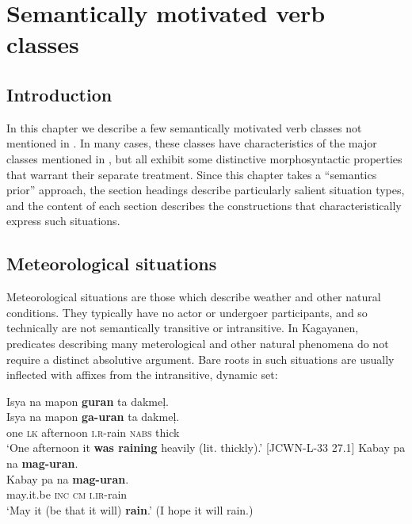 \chapter{Semantically motivated verb classes}
\label{chap:verbclasses-2}
\section{Introduction}
\label{sec:introduction-9}

In this chapter we describe a few semantically motivated verb classes not mentioned in . In many cases, these classes have characteristics of the major classes mentioned in , but all exhibit some distinctive morphosyntactic properties that warrant their separate treatment. Since this chapter takes a “semantics prior” approach, the section headings describe particularly salient situation types, and the content of each section describes the constructions that characteristically express such situations.

\section{Meteorological situations}
\label{sec:meteorologicalsituations}

Meteorological situations are those which describe weather and other natural conditions. They typically have no actor or undergoer participants, and so technically are not semantically transitive or intransitive. In Kagayanen, predicates describing many meterological and other natural phenomena do not require a distinct absolutive argument. Bare roots in such situations are usually inflected with affixes from the intransitive, dynamic set:

\ea
Isya  na  mapon  \textbf{guran}   ta  dakmeļ. \\\smallskip
\gll Isya  na  mapon  \textbf{ga-uran}   ta  dakmeļ. \\
one  \textsc{lk} afternoon  \textsc{i.r}-rain  \textsc{nabs}  thick \\
\glt ‘One afternoon it \textbf{was raining} heavily (lit. thickly).’ [JCWN-L-33 27.1]
\z
\ea
Kabay  pa  na  \textbf{mag-uran}. \\\smallskip
\gll Kabay  pa  na  \textbf{mag-uran}. \\
may.it.be  \textsc{inc}  \textsc{cm}  \textsc{i.ir}-rain \\
\glt ‘May it (be that it will) \textbf{rain}.’ (I hope it will rain.)
\z

